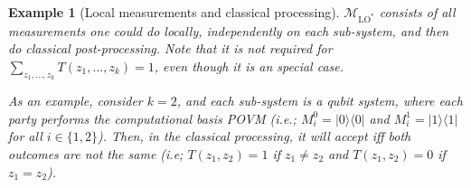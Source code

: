 \documentclass[11pt]{article}
\theoremstyle{plain}
\newtheorem{example}[theo]{Example}
\theoremstyle{remark}
\begin{document}
\begin{example}[Local measurements and classical processing]
    $\mathcal{M}_{\operatorname{LO}^*} $ consists of all measurements one could do locally, independently on each sub-system, and then do classical post-processing. Note that it is not required for 
    $\sum_{z_1,\ldots,z_k} T(z_1,\dots,z_k) =1$, even though it is an special case. 
    
    As an example, consider $k=2$, and each sub-system is a qubit system, where each party performs the computational basis POVM (i.e.; $M^{0}_i =|0\rangle\!\langle 0|$ and $M^{1}_i =|1\rangle\!\langle 1|$ for all $i \in \{1,2\}$). Then, in the classical processing, it will accept iff both outcomes are not the same (i.e; $T(z_1, z_2)=1$ if $z_1 \neq z_2$ and $T(z_1, z_2)=0$ if $z_1 = z_2$). 
\end{example}
\end{document}
